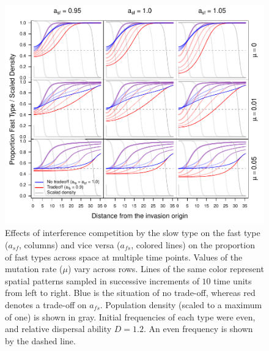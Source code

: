 \documentclass[11pt]{article}
\begin{document}
\begin{figure}[!ht]
\begin{center}
\includegraphics[width=4.68in]{../output/clines_afs.pdf}
\end{center}
\caption{
Effects of interference competition by the slow type on the fast type ($a_{sf}$, columns) and vice versa ($a_{fs}$, colored lines) on the proportion of fast types across space at multiple time points. Values of the mutation rate ($\mu$) vary across rows. Lines of the same color represent spatial patterns sampled in successive increments of $10$ time units from left to right. Blue is the situation of no trade-off, whereas red denotes a trade-off on $a_{fs}$. Population density (scaled to a maximum of one) is shown in gray. Initial frequencies of each type were even, and relative dispersal ability $D=1.2$. An even frequency is shown by the dashed line.
}
\label{fcline_afs}
\end{figure}
\end{document}
